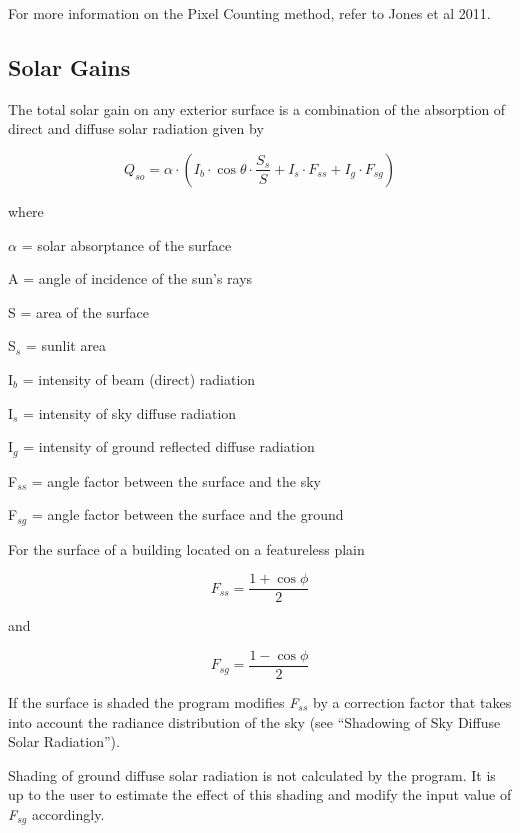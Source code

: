 For more information on the Pixel Counting method, refer to Jones et al 2011.

\subsection{Solar Gains}\label{solar-gains-000}

The total solar gain on any exterior surface is a combination of the absorption of direct and diffuse solar radiation given by

\begin{equation}
{Q_{so}} = \alpha \cdot \left( {{I_b}\cdot \cos \theta \cdot \frac{{{S_s}}}{S} + {I_s}\cdot {F_{ss}} + {I_g}\cdot {F_{sg}}} \right)
\end{equation}

where

$\alpha$ = solar absorptance of the surface

A = angle of incidence of the sun's rays

S = area of the surface

S\(_{s}\) = sunlit area

I\(_{b}\) = intensity of beam (direct) radiation

I\(_{s}\) = intensity of sky diffuse radiation

I\(_{g}\) = intensity of ground reflected diffuse radiation

F\(_{ss}\) = angle factor between the surface and the sky

F\(_{sg}\) = angle factor between the surface and the ground

For the surface of a building located on a featureless plain

\begin{equation}
{F_{ss}} = \frac{{1 + \cos \phi }}{2}
\end{equation}

and

\begin{equation}
{F_{sg}} = \frac{{1 - \cos \phi }}{2}
\end{equation}

If the surface is shaded the program modifies \emph{F\(_{ss}\)} by a correction factor that takes into account the radiance distribution of the sky (see ``Shadowing of Sky Diffuse Solar Radiation'').

Shading of ground diffuse solar radiation is not calculated by the program. It is up to the user to estimate the effect of this shading and modify the input value of \emph{F\(_{sg}\)} accordingly.

